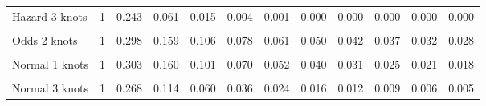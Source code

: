 \documentclass[
]{article}
\begin{document}
\begin{table}[H]
{\begin{tabular}[t]{lrrrrrrrrrrr}
Hazard 3 knots & 1 & 0.243 & 0.061 & 0.015 & 0.004 & 0.001 & 0.000 & 0.000 & 0.000 & 0.000 & 0.000\\
\cellcolor{gray!10}{Odds 1 knots} & \cellcolor{gray!10}{1} & \cellcolor{gray!10}{0.320} & \cellcolor{gray!10}{0.190} & \cellcolor{gray!10}{0.135} & \cellcolor{gray!10}{0.104} & \cellcolor{gray!10}{0.085} & \cellcolor{gray!10}{0.072} & \cellcolor{gray!10}{0.062} & \cellcolor{gray!10}{0.055} & \cellcolor{gray!10}{0.049} & \cellcolor{gray!10}{0.044}\\
Odds 2 knots & 1 & 0.298 & 0.159 & 0.106 & 0.078 & 0.061 & 0.050 & 0.042 & 0.037 & 0.032 & 0.028\\
\cellcolor{gray!10}{Odds 3 knots} & \cellcolor{gray!10}{1} & \cellcolor{gray!10}{0.272} & \cellcolor{gray!10}{0.127} & \cellcolor{gray!10}{0.078} & \cellcolor{gray!10}{0.054} & \cellcolor{gray!10}{0.040} & \cellcolor{gray!10}{0.032} & \cellcolor{gray!10}{0.026} & \cellcolor{gray!10}{0.022} & \cellcolor{gray!10}{0.019} & \cellcolor{gray!10}{0.016}\\
Normal 1 knots & 1 & 0.303 & 0.160 & 0.101 & 0.070 & 0.052 & 0.040 & 0.031 & 0.025 & 0.021 & 0.018\\
\cellcolor{gray!10}{Normal 2 knots} & \cellcolor{gray!10}{1} & \cellcolor{gray!10}{0.299} & \cellcolor{gray!10}{0.154} & \cellcolor{gray!10}{0.096} & \cellcolor{gray!10}{0.065} & \cellcolor{gray!10}{0.047} & \cellcolor{gray!10}{0.036} & \cellcolor{gray!10}{0.028} & \cellcolor{gray!10}{0.023} & \cellcolor{gray!10}{0.018} & \cellcolor{gray!10}{0.015}\\
Normal 3 knots & 1 & 0.268 & 0.114 & 0.060 & 0.036 & 0.024 & 0.016 & 0.012 & 0.009 & 0.006 & 0.005\\
\bottomrule
\end{tabular}}
\end{table}
\end{document}

